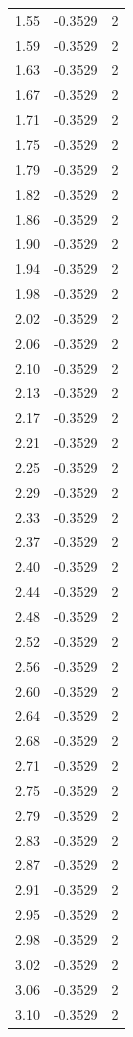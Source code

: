 \begin{longtable}{lrr}
  1.55 & -0.3529 & 2 \\
  1.59 & -0.3529 & 2 \\
  1.63 & -0.3529 & 2 \\
  1.67 & -0.3529 & 2 \\
  1.71 & -0.3529 & 2 \\
  1.75 & -0.3529 & 2 \\
  1.79 & -0.3529 & 2 \\
  1.82 & -0.3529 & 2 \\
  1.86 & -0.3529 & 2 \\
  1.90 & -0.3529 & 2 \\
  1.94 & -0.3529 & 2 \\
  1.98 & -0.3529 & 2 \\
  2.02 & -0.3529 & 2 \\
  2.06 & -0.3529 & 2 \\
  2.10 & -0.3529 & 2 \\
  2.13 & -0.3529 & 2 \\
  2.17 & -0.3529 & 2 \\
  2.21 & -0.3529 & 2 \\
  2.25 & -0.3529 & 2 \\
  2.29 & -0.3529 & 2 \\
  2.33 & -0.3529 & 2 \\
  2.37 & -0.3529 & 2 \\
  2.40 & -0.3529 & 2 \\
  2.44 & -0.3529 & 2 \\
  2.48 & -0.3529 & 2 \\
  2.52 & -0.3529 & 2 \\
  2.56 & -0.3529 & 2 \\
  2.60 & -0.3529 & 2 \\
  2.64 & -0.3529 & 2 \\
  2.68 & -0.3529 & 2 \\
  2.71 & -0.3529 & 2 \\
  2.75 & -0.3529 & 2 \\
  2.79 & -0.3529 & 2 \\
  2.83 & -0.3529 & 2 \\
  2.87 & -0.3529 & 2 \\
  2.91 & -0.3529 & 2 \\
  2.95 & -0.3529 & 2 \\
  2.98 & -0.3529 & 2 \\
  3.02 & -0.3529 & 2 \\
  3.06 & -0.3529 & 2 \\
  3.10 & -0.3529 & 2 \\

\end{longtable}
